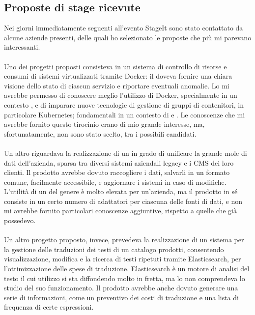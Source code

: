    \subsection{Proposte di stage ricevute}
   Nei giorni immediatamente seguenti all'evento StageIt sono stato contattato da alcune aziende presenti, delle quali ho selezionato le proposte che più mi parevano interessanti.
   \paragraph*{}
   Uno dei progetti proposti consisteva in un sistema di controllo di risorse e consumi di sistemi virtualizzati tramite \gls{Docker}: il  doveva fornire una chiara visione dello stato di ciascun servizio e riportare eventuali anomalie. Lo  mi avrebbe permesso di conoscere meglio l'utilizzo di Docker, specialmente in un contesto , e di imparare nuove tecnologie di gestione di gruppi di contenitori, in particolare Kubernetes; fondamentali in un contesto di  e . Le conoscenze che mi avrebbe fornito questo tirocinio erano di mio grande interesse, ma, sfortunatamente, non sono stato scelto, tra i possibili candidati.
   \paragraph*{}
   Un altro  riguardava la realizzazione di un  in grado di unificare la grande mole di dati dell'azienda, sparsa tra diversi sistemi aziendali legacy e i \gls{CMS} dei loro clienti. Il prodotto avrebbe dovuto raccogliere i dati, salvarli in un formato comune, facilmente accessibile, e aggiornare i sistemi in caso di modifiche. L'utilità di un  del genere è molto elevata per un'azienda, ma il prodotto in sé consiste in un certo numero di adattatori per ciascuna delle fonti di dati, e non mi avrebbe fornito particolari conoscenze aggiuntive, rispetto a quelle che già possedevo.
   \paragraph*{}
   Un altro progetto proposto, invece, prevedeva la realizzazione di un sistema per la gestione delle traduzioni dei testi di un catalogo prodotti, consentendo visualizzazione, modifica e la ricerca di testi ripetuti tramite Elasticsearch, per l'ottimizzazione delle spese di traduzione. Elasticsearch è un motore di analisi del testo il cui utilizzo si sta diffondendo molto in fretta, ma lo  non comprendeva lo studio del suo funzionamento. Il prodotto avrebbe anche dovuto generare una serie di informazioni, come un preventivo dei costi di traduzione e una lista di frequenza di certe espressioni.
